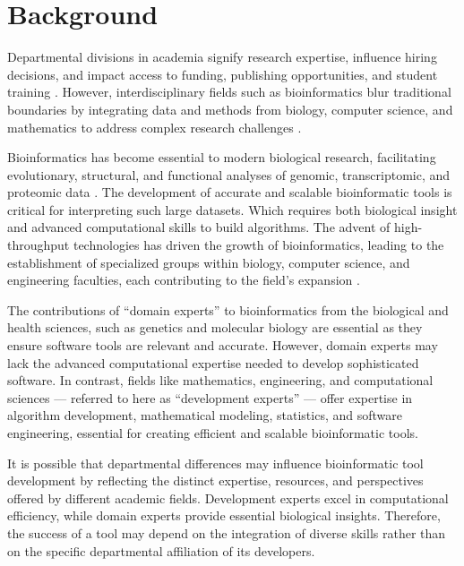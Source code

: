 \documentclass[fleqn,10pt,doc,onecolumn]{SelfArx}%
\affiliation{\textsuperscript{1}\textit{Department of Biochemistry, University of Otago, Dunedin, New Zealand.}} %
\affiliation{*\textbf{Corresponding author}: paul.gardner@otago.ac.nz} %
\begin{document}
\flushbottom %
\maketitle %

\thispagestyle{empty} %

\section*{Background}

Departmental divisions in academia signify research expertise,
influence hiring decisions, and impact access to funding, publishing
opportunities, and student training
\cite{bourke1998institutions,ben2016s}. However, interdisciplinary
fields such as bioinformatics blur traditional boundaries by
integrating data and methods from biology, computer science, and
mathematics to address complex research challenges
\cite{Ouzounis:2003,Eddy:2005,hogeweg2011roots}.

Bioinformatics has become essential to modern biological research,
facilitating evolutionary, structural, and functional analyses of
genomic, transcriptomic, and proteomic data
\cite{clement2018data,gauthier2019brief}. The development of accurate and
scalable bioinformatic tools is critical for interpreting such large
datasets. Which requires both biological insight and advanced
computational skills to build algorithms. The advent of
high-throughput technologies has driven the growth of bioinformatics,
leading to the establishment of specialized groups within biology,
computer science, and engineering faculties, each contributing to the
field’s expansion
\cite{hogeweg2011roots,gauthier2019brief}.

The contributions of ``domain experts'' to bioinformatics from the
biological and health sciences, such as genetics and molecular biology
are essential as they ensure software tools are relevant and accurate.
However, domain experts may lack the advanced computational expertise
needed to develop sophisticated software. In contrast, fields like
mathematics, engineering, and computational sciences — referred to
here as ``development experts'' — offer expertise in algorithm
development, mathematical modeling, statistics, and software
engineering, essential for creating efficient and scalable
bioinformatic tools.

It is possible that departmental differences may influence
bioinformatic tool development by reflecting the distinct expertise,
resources, and perspectives offered by different academic
fields. Development experts excel in computational efficiency, while
domain experts provide essential biological insights. Therefore, the
success of a tool may depend on the integration of diverse
skills rather than on the specific departmental affiliation of its
developers. 
\end{document}
